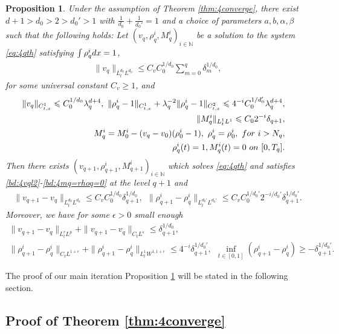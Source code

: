 \documentclass[10pt,a4paper]{amsart}
\numberwithin{equation}{section}
\newtheorem{proposition}[theorem]{Proposition}
\def\dif{{\mathord{{\rm d}}}}
\def\mN{{\mathbb N}}
\def\geq{\geqslant}
\def\leq{\leqslant}
\def\dif{{\mathord{{\rm d}}}}
\def\bp{\begin{proposition}}
\def\ep{\end{proposition}}
\def\geq{\geqslant}
\def\leq{\leqslant}
\begin{document}
\bp\label{prop:case4} 
Under the assumption of Theorem \ref{thm:4converge}, there exist $d+1>d_0>2>d_0'>1$ with $\frac{1}{d_0}+\frac{1}{d_0'}=1$ and a choice of parameters $a,b,\alpha,\beta$  such
that the following holds: Let $(v_q,\rho^{i}_q,  M^{i}_q)_{i\in\mN}$ be a solution to the system \eqref{eq:4qth} satisfying  $\int\rho^{i}_q\dif x=1$,
\begin{align}\label{bd:4vql2}
\|v_q\|_{L^{d_0}_tL^{d_0}}\leq C_vC_0^{1/d_0}\sum_{m=0}^q\delta_{m}^{1/d_0},
\end{align}
for some universal constant $C_v\geq1$, and
\begin{align}
\|v_q\|_{C_{t,x}^1}\leq C_0^{1/d_0}\lambda_q^{d+4},\
  \|\rho^{i}_{q}-1\|_{C_{t,x}^1}+\lambda_q^{-2}\|\rho^{i}_{q}-1\|_{C_{t,x}^2}\leq 4^{-i}C_0^{1/d_0'}\lambda_q^{d+4},
\label{bd:4rhoqc1}\\
 \|M^{i}_q\|_{L^1_tL^1}\leq C_02^{-i}\delta_{q+1},&\label{bd:4rql1}\\
 M^{i}_{q}=M^{i}_{0}-(v_{q}-v_0)(\rho^{i}_0-1),\ \rho_q^{i}=\rho_0^{i}, \ {\rm for\ }  i>N_{q},\label{bd:4mqi>nq}\\
 \rho^{i}_q(t)=1, M^{i}_q(t)=0\ {\rm on}\ [0,T_q].&\label{bd:4mq=rhoq=0}
\end{align}
Then there exists 
$(v_{q+1},\rho^{i}_{q+1},  M^{i}_{q+1})_{i\in\mN}$ which solves \eqref{eq:4qth} and satisfies \eqref{bd:4vql2}-\eqref{bd:4mq=rhoq=0} at the level $q+1$ and
\begin{align}
\|v_{q+1}-v_{q}\|_{L^{d_0}_tL^{d_0}}\leq
C_vC_0^{1/d_0}\delta_{q+1}^{1/d_0},\label{bd:4vq+1-vqldd}\ \
\|\rho^{i}_{q+1}-\rho^{i}_{q}\|_{L^{d_0'}_tL^{d_0'}}\leq
C_v C_0^{1/{d_0'}}2^{-i/d_0'}\delta_{q+1}^{1/{d_0'}}.%
\end{align}
Moreover, we have for some $\epsilon>0$ small enough
\begin{align}
\|v_{q+1}-v_{q}\|_{L^{r}_tL^{p}}+\|v_{q+1}-v_q\|_{C_tL^s}\leq
\delta_{q+1}^{1/d_0},\label{bd:4vq+1-vqlpr}\\
\|\rho^{i}_{q+1}-\rho^{i}_{q}\|_{C_tL^{1+\epsilon}}+ \|\rho^{i}_{q+1}-\rho^{i}_{q}\|_{L_t^1W^{1,1+\epsilon}}\leq
4^{-i}\delta_{q+1}^{1/d_0'},\ \  \inf_{t\in [0,1]}(\rho^{i}_{q+1} - \rho^{i}_q)\geq - \delta_{q+1}^{1/d_0'} .\label{bd:4rhoq+1-rhoql1}
\end{align}
\ep


 The proof of our main iteration Proposition \ref{prop:case4} will be stated in the following section.


 
\subsection{Proof of   Theorem \ref{thm:4converge}}\label{sec:proofmaireuslt}
  
\end{document}

